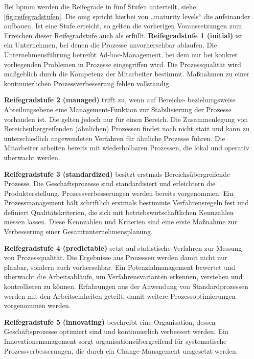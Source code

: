 Bei \acs{bpmm} werden die Reifegrade in fünf Stufen unterteilt, siehe \autoref{fig:reifegradstufen}. Die \acs{omg} spricht hierbei von „maturity levels“ die aufeinander aufbauen. Ist eine Stufe erreicht, so gelten die vorherigen Voraussetzungen zum Erreichen dieser Reifegradstufe auch als erfüllt.
\textbf{Reifegradstufe 1 (initial)} ist ein Unternehmen, bei denen die Prozesse unvorhersehbar ablaufen. Die Unternehmensführung betreibt Ad-hoc-Management, bei dem nur bei konkret vorliegenden Problemen in Prozesse eingegriffen wird. Die Prozessqualität wird maßgeblich durch die Kompetenz der Mitarbeiter bestimmt. Maßnahmen zu einer kontinuierlichen Prozessverbesserung fehlen vollständig.
\par
\textbf{Reifegradstufe 2 (managed)} trifft zu, wenn auf Bereichs- beziehungsweise Abteilungsebene eine Management-Funktion zur Stabilisierung der Prozesse vorhanden ist. Die gelten jedoch nur für einen Bereich. Die Zusammenlegung von Bereichsübergreifenden (ähnlichen) Prozessen findet noch nicht statt und kann zu unterschiedlich angewendeten Verfahren für ähnliche Prozesse führen. Die Mitarbeiter arbeiten bereits mit wiederholbaren Prozessen, die lokal und operativ überwacht werden.
\par
\textbf{Reifegradstufe 3 (standardized)} besitzt erstmals Bereichsübergreifende Prozesse. Die Geschäftsprozesse sind standardisiert und erleichtern die Produkterstellung. Prozessverbesserungen werden bereits vorgenommen. Ein Prozessmanagement hält schriftlich erstmals bestimmte Verfahrensregeln fest und definiert Qualitätskriterien, die sich mit betriebswirtschaftlichen Kennzahlen messen lassen. Diese Kennzahlen und Kriterien sind eine erste Maßnahme zur Verbesserung einer Gesamtunternehmensplanung.
\par
\textbf{Reifegradstufe 4 (predictable)} setzt auf statistische Verfahren zur Messung von Prozessqualität. Die Ergebnisse aus Prozessen werden damit nicht nur planbar, sondern auch vorhersehbar. Ein Potenzialmanagement bewertet und überwacht die Arbeitsabläufe, um Verfahrensvarianten erkennen, verstehen und kontrollieren zu können. Erfahrungen aus der Anwendung von Standardprozessen werden mit den Arbeitseinheiten geteilt, damit weitere Prozessoptimierungen vorgenommen werden.
\par
\textbf{Reifegradstufe 5 (innovating)} beschreibt eine Organisation, dessen Geschäftsprozesse optimiert sind und kontinuierlich verbessert werden. Ein Innovationsmanagement sorgt organisationsübergreifend für systematische Prozessverbesserungen, die durch ein Change-Management umgesetzt werden.
\par

